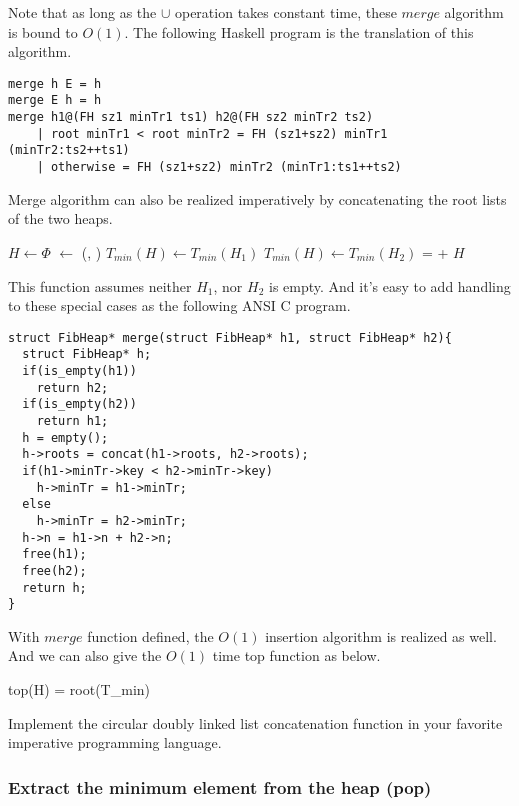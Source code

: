 \documentclass{article}
\begin{document}
Note that as long as the $\cup$ operation takes constant time, these
$merge$ algorithm is bound to $O(1)$. The following Haskell program
is the translation of this algorithm.

\lstset{language=Haskell}
\begin{lstlisting}
merge h E = h
merge E h = h
merge h1@(FH sz1 minTr1 ts1) h2@(FH sz2 minTr2 ts2)
    | root minTr1 < root minTr2 = FH (sz1+sz2) minTr1 (minTr2:ts2++ts1)
    | otherwise = FH (sz1+sz2) minTr2 (minTr1:ts1++ts2)
\end{lstlisting}

Merge algorithm can also be realized imperatively by concatenating
the root lists of the two heaps.

\begin{algorithmic}[1]
  \State $H \gets \Phi$
  \State {} $\gets$ (, )
    \State $T_{min}(H) \gets T_{min}(H_1)$
  \Else
    \State $T_{min}(H) \gets T_{min}(H_2)$
  \EndIf
   =  + 
  \State \Return $H$
\EndFunction
\end{algorithmic}

This function assumes neither $H_1$, nor $H_2$ is empty. And it's easy
to add handling to these special cases as the following ANSI C program.

\lstset{language=C}
\begin{lstlisting}
struct FibHeap* merge(struct FibHeap* h1, struct FibHeap* h2){
  struct FibHeap* h;
  if(is_empty(h1))
    return h2;
  if(is_empty(h2))
    return h1;
  h = empty();
  h->roots = concat(h1->roots, h2->roots);
  if(h1->minTr->key < h2->minTr->key)
    h->minTr = h1->minTr;
  else
    h->minTr = h2->minTr;
  h->n = h1->n + h2->n;
  free(h1);
  free(h2);
  return h;
}
\end{lstlisting}

With $merge$ function defined, the $O(1)$ insertion algorithm is realized
as well. And we can also give the $O(1)$ time top function as below.

\be
top(H) = root(T_{min})
\ee

\begin{Exercise}
Implement the circular doubly linked list concatenation function in
your favorite imperative programming language.
\end{Exercise}

\subsubsection{Extract the minimum element from the heap (pop)}
 
\end{document}
